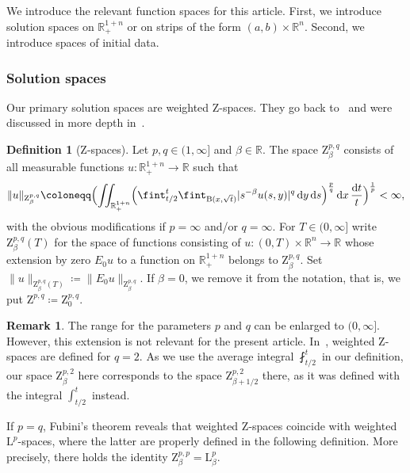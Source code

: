 \documentclass[11pt, leqno]{amsart}
\theoremstyle{definition}
\newtheorem{definition}[theorem]{Definition}
\newtheorem{remark}[theorem]{Remark}
\newcommand{\R}{\mathbb{R}}
\renewcommand{\L}{\mathrm{L}}
\newcommand{\Z}{\mathrm{Z}}
\renewcommand{\d}{\,\mathrm{d}}
\newcommand{\ddt}{\,\frac{\mathrm{d}t}{t}}
\newcommand{\B}{\mathrm{B}}
\begin{document}
	We introduce the relevant function spaces for this article. First, we introduce solution spaces on $\R^{1+n}_+$ or on strips of the form $(a,b) \times \R^n$. Second, we introduce spaces of initial data.

	\subsubsection*{Solution spaces}

	Our primary solution spaces are weighted $\Z$-spaces. They go back to~\cite{Barton_Mayboroda} and were discussed in more depth in~\cite{Amenta_Interpolation,Luca}.

	\begin{definition}[$\Z$-spaces]
		\label{def:Z_space}
		Let $p,q \in (1,\infty]$ and $\beta \in \R$. The space $\Z^{p,q}_\beta$ consists of all measurable functions $u \colon \R^{1+n}_+ \to \R$ such that
		\begin{align}
			\| u \|_{\Z^{p,q}_\beta} \coloneqq \Bigl( \iint_{\R^{1+n}_+} \Bigl( \fint_{t/2}^t \fint_{\B(x, \sqrt{t})} |s^{-\beta} u(s,y)|^q \d y \d s \Bigr)^\frac{p}{q} \d x \ddt \Bigr)^\frac{1}{p} < \infty,
		\end{align}
		with the obvious modifications if $p=\infty$ and/or $q=\infty$.
		For $T \in (0,\infty]$ write $\Z^{p,q}_\beta(T)$ for the space of functions consisting of $u \colon (0,T) \times \R^n \to \R$ whose extension by zero $E_0 u$ to a function on $\R^{1+n}_+$ belongs to $\Z^{p,q}_\beta$. Set $\| u \|_{\Z^{p,q}_\beta(T)} \coloneqq \| E_0 u \|_{\Z^{p,q}_\beta}$. If $\beta = 0$, we remove it from the notation, that is, we put $\Z^{p,q} \coloneqq \Z^{p,q}_0$.
	\end{definition}

	\begin{remark}
		\label{rem:Z_spaces}
		The range for the parameters $p$ and $q$ can be enlarged to $(0,\infty]$. However, this extension is not relevant for the present article.
		In~\cite{AH3}, weighted $\Z$-spaces are defined for $q = 2$.
		As we use the average integral $\fint_{t/2}^t$ in our definition, our space $\Z^{p,2}_\beta$ here corresponds to the space $\Z^{p,2}_{\beta + 1/2}$ there, as it was defined with the integral $\int_{t/2}^t$ instead.
	\end{remark}

	If $p = q$, Fubini's theorem reveals that weighted $\Z$-spaces coincide with weighted $\L^p$-spaces, where the latter are properly defined in the following definition. More precisely, there holds the identity $\Z^{p,p}_\beta = \L^p_\beta$.
\end{document}
